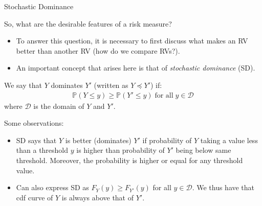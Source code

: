 \documentclass[9pt]{beamer}
\begin{document}
%
\begin{frame}{Stochastic Dominance}
\begin{block}{}
So, what are the desirable features of a risk measure?
\end{block}
\begin{itemize}
\item To answer this question, it is necessary to first discuss what makes an RV better than another RV (how do we compare RVs?). 

\item An important concept that arises here is that of {\em stochastic dominance} (SD).

\end{itemize}

\begin{block}{}
We say that $Y$ dominates $Y'$ (written as $Y\preceq Y'$) if:
\begin{align*}
\mathbb{P}(Y\leq y)\geq \mathbb{P}(Y'\leq y)\; \textrm{for all}\;  y\in \mathcal{D}
\end{align*}
where $\mathcal{D}$ is the domain of $Y$ and $Y'$. 
\end{block}
Some observations:
\begin{itemize}
\item SD says that $Y$ is better (dominates) $Y'$ if probability of $Y$ taking a value less than a threshold $y$ is higher than probability of $Y'$ being below same threshold. Moreover, the probability is higher or equal for any threshold value. 
\item Can also express SD as $F_{Y}(y)\geq F_{Y'}(y)$ for all $y\in\mathcal{D}$. We thus have that cdf curve of $Y$ is always above that of $Y'$. 

\end{itemize}


\end{frame}
\end{document}

